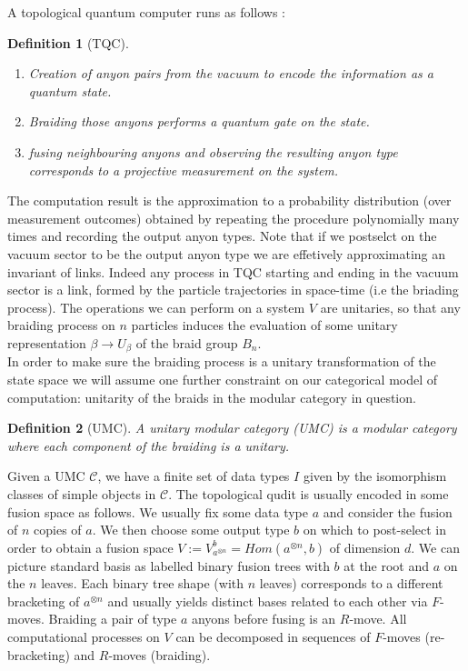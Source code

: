 \documentclass{article}
\newtheorem{definition}{Definition}
\newcommand{\cat}{\mathcal{C}}
\begin{document}
A topological quantum computer runs as follows \cite{Rowell17}:
\begin{definition}[TQC]
	\begin{enumerate}
		\item Creation of anyon pairs from the vacuum to encode the information as a quantum state.
		\item Braiding those anyons performs a quantum gate on the state.
		\item fusing neighbouring anyons and observing the resulting anyon type corresponds to a projective measurement on the system.
	\end{enumerate}
\end{definition}
The computation result is the approximation to a probability distribution (over measurement outcomes) obtained by repeating the procedure polynomially many times and recording the output anyon types. Note that if we postselct on the vacuum sector to be the output anyon type we are effetively approximating an invariant of links. Indeed any process in TQC starting and ending in the vacuum sector is a link, formed by the particle trajectories in space-time (i.e the briading process). The operations we can perform on a system $V$ are unitaries, so that any braiding process on $n$ particles induces the evaluation of some unitary representation $\beta \rightarrow U_\beta$ of the braid group $B_n$.\\
In order to make sure the braiding process is a unitary transformation of the state space we will assume one further constraint on our categorical model of computation: unitarity of the braids in the modular category in question.\\
\begin{definition}[UMC]
	A unitary modular category (UMC) is a modular category where each component of the braiding is a unitary.
\end{definition}
Given a UMC $\cat$, we have a finite set of data types $I$ given by the isomorphism classes of simple objects in $\cat$. The topological qudit is usually encoded in some fusion space as follows. We usually fix some data type $a$ and consider the fusion of $n$ copies of $a$. We then choose some output type $b$ on which to post-select in order to obtain a fusion space $V := V_{a^{\otimes n}}^b = Hom(a^{\otimes n}, b)$ of dimension $d$. We can picture standard basis as labelled binary fusion trees with $b$ at the root and $a$ on the $n$ leaves. Each binary tree shape (with $n$ leaves) corresponds to a different bracketing of $a^{\otimes n}$ and usually yields distinct bases related to each other via $F$-moves. Braiding a pair of type $a$ anyons before fusing is an $R$-move. All computational processes on $V$ can be decomposed in sequences of $F$-moves (re-bracketing) and $R$-moves (braiding).
\end{document}
